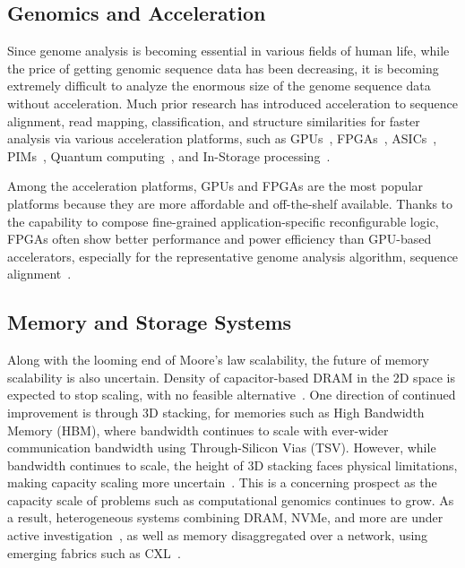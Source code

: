 \subsection{Genomics and Acceleration}

Since genome analysis is becoming essential in various fields of human life, while the price of getting genomic sequence data has been decreasing, it is becoming extremely difficult to analyze the enormous size of the genome sequence data without acceleration.
Much prior research has introduced acceleration to sequence alignment, read mapping, classification, and structure similarities for faster analysis via various acceleration platforms, such as GPUs~\cite{zeni2020logan,cheng2018bitmapper2,kobus2017accelerating,nishimura2017accelerating,wilton2015arioc,cadenelli2017accelerating}, FPGAs~\cite{liyanage2023efficient,li2021pipebsw,haghi2021fpga,qiao2019fpga,ham2020genesis}, ASICs~\cite{turakhia2019darwin,fujiki2018genax,huangfu2018radar,huangfu2022beacon,cali2022segram,cali2020genasm}, PIMs~\cite{zhang2023aligner,jahshan2023dash,zou2022biohd,shahroodi2022krakenonmem,chen2023gem,kaplan2020bioseal}, Quantum computing~\cite{varsamis2023quantum}, and In-Storage processing~\cite{mansouri2022genstore}.

Among the acceleration platforms, GPUs and FPGAs are the most popular platforms because they are more affordable and off-the-shelf available.
Thanks to the capability to compose fine-grained application-specific reconfigurable logic, FPGAs often show better performance and power efficiency than GPU-based accelerators, especially for the representative genome analysis algorithm, sequence alignment~\cite{cheng24fpga,guo2019fpga}. 


\subsection{Memory and Storage Systems}

Along with the looming end of Moore's law scalability, the future of memory scalability is also uncertain.
Density of capacitor-based DRAM in the 2D space is expected to stop scaling, with no feasible alternative~\cite{endofdram}.
One direction of continued improvement is through 3D stacking, for memories such as High Bandwidth Memory (HBM), where bandwidth continues to scale with ever-wider communication bandwidth using Through-Silicon Vias (TSV).
However, while bandwidth continues to scale, the height of 3D stacking faces physical limitations, making capacity scaling more uncertain~\cite{kim2015architectural,shiratake2020scaling,kim2024present,hyun2024pathfinding}.
This is a concerning prospect as the capacity scale of problems such as computational genomics continues to grow.
As a result, heterogeneous systems combining DRAM, NVMe, and more are under active investigation~\cite{ziegler2022scalestore,cadenelli2017accelerating}, as well as memory disaggregated over a network, using emerging fabrics such as CXL~\cite{gouk2023memorycxl,huangfu2022beacon}.


